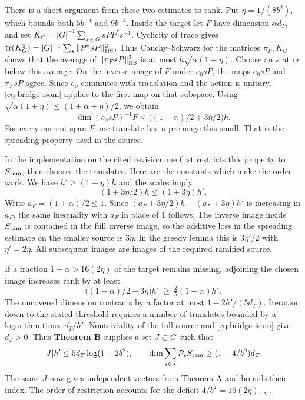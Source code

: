 There is a short argument from these two estimates to rank. Put \(\eta=1/(8b^2)\), which bounds both \(5b^{-4}\) and \(9b^{-4}\). Inside the target let \(F\) have dimension \(\alpha d_T\), and set \(K_G=|G|^{-1}\sum_{s\in G}sPP^*s^{-1}\). Cyclicity of trace gives \(\operatorname{tr}(K_G^2)=|G|^{-1}\sum_s\|P^*sP\|_{\rm HS}^2\). Thus Cauchy--Schwarz for the matrices \(\pi_F,K_G\) shows that the average of \(\|\pi_F sP\|_{\rm HS}^2\) is at most \(h\sqrt{\alpha(1+\eta)}\). Choose an \(s\) at or below this average. On the inverse image of \(F\) under \(e_0sP\), the maps \(e_0sP\) and \(\pi_FsP\) agree. Since \(e_0\) commutes with translation and the action is unitary, \eqref{eq:bridge-isom} applies to the first map on that subspace. Using \(\sqrt{\alpha(1+\eta)}\le (1+\alpha+\eta)/2\), we obtain
\[
   \dim (e_0sP)^{-1}F
     \le \bigl((1+\alpha)/2+3\eta/2\bigr)h.
\]
For every current span \(F\) one translate has a preimage this small. That is the spreading property used in the source.

In the implementation on the cited revision one first restricts this property to \(S_{\rm ram}\), then chooses the translates. Here are the constants which make the order work. We have \(h'\ge(1-\eta)h\) and the scales imply
\[
     (1+3\eta/2)h\le(1+3\eta)h'.
\]
Write \(a_F=(1+\alpha)/2\le1\). Since
\((a_F+3\eta/2)h-(a_F+3\eta)h'\) is increasing in \(a_F\), the same inequality with \(a_F\) in place of \(1\) follows. The inverse image inside \(S_{\rm ram}\) is contained in the full inverse image, so the additive loss in the spreading estimate on the smaller source is \(3\eta\). In the greedy lemma this is \(3\eta'/2\) with \(\eta'=2\eta\). All subsequent images are images of the required ramified source.

If a fraction \(1-\alpha>16(2\eta)\) of the target remains missing, adjoining the chosen image increases rank by at least
\[
   \bigl((1-\alpha)/2-3\eta\bigr)h'
            \ \ge\ \tfrac25(1-\alpha)h'.
\]
The uncovered dimension contracts by a factor at most \(1-2h'/(5d_T)\). Iteration down to the stated threshold requires a number of translates bounded by a logarithm times \(d_T/h'\). Nontriviality of the full source and \eqref{eq:bridge-isom} give \(d_T>0\). Thus \textbf{Theorem B} supplies a set \(J\subset G\) such that
\begin{equation}\label{eq:bridge-enough}
  |J|h'\le5d_T\log(1+2b^2),\qquad
  \dim\sum_{s\in J}\mathcal P_s S_{\rm ram}
                         \ge(1-4/b^2)d_T .
\end{equation}
The same \(J\) now gives independent vectors from Theorem A and bounds their index. The order of restriction accounts for the deficit \(4/b^2=16(2\eta)\). , .
